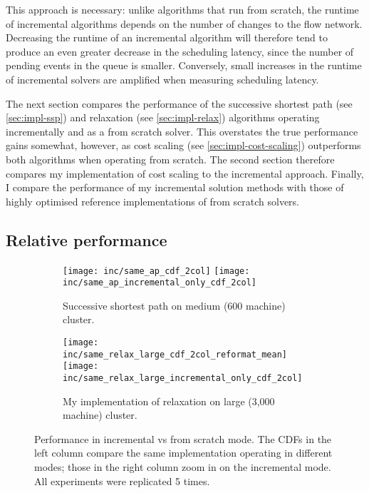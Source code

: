 
This approach is necessary: unlike algorithms that run from scratch, the runtime of incremental algorithms depends on the number of changes to the flow network. Decreasing the runtime of an incremental algorithm will therefore tend to produce an even greater decrease in the scheduling latency, since the number of pending events in the queue is smaller. Conversely, small increases in the runtime of incremental solvers are amplified when measuring scheduling latency. 

The next section compares the performance of the successive shortest path (see \cref{sec:impl-ssp}) and relaxation (see \cref{sec:impl-relax}) algorithms operating incrementally and as a from scratch solver. This overstates the true performance gains somewhat, however, as cost scaling (see \cref{sec:impl-cost-scaling}) outperforms both algorithms when operating from scratch. The second section therefore compares my implementation of cost scaling to the incremental approach. Finally, I compare the performance of my incremental solution methods with those of highly optimised reference implementations of from scratch solvers.

\subsection{Relative performance}

\begin{figure}
    \begin{widepage}
        \begin{subfigure}[c]{\textwidth}
            \texttt{[image: inc/same\_ap\_cdf\_2col]}
            \texttt{[image: inc/same\_ap\_incremental\_only\_cdf\_2col]}
            \caption{Successive shortest path on medium (600 machine) cluster.}
            \label{fig:inc-same:ssp}
        \end{subfigure}
        \begin{subfigure}[c]{\textwidth}
            \texttt{[image: inc/same\_relax\_large\_cdf\_2col\_reformat\_mean]}                        \texttt{[image: inc/same\_relax\_large\_incremental\_only\_cdf\_2col]}
            \caption{My implementation of relaxation on large (3,000 machine) cluster.}
            \label{fig:inc-same:relax-my}
        \end{subfigure}
    \end{widepage}
    \caption[Performance in incremental vs from scratch mode]{Performance in incremental vs from scratch mode. The CDFs in the left column compare the same implementation operating in different modes; those in the right column zoom in on the incremental mode. All experiments were replicated 5 times.}
    \label{fig:inc-same}
\end{figure}

